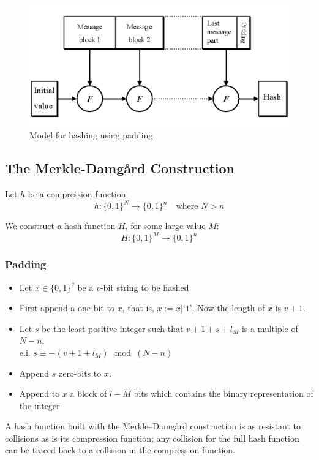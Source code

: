 \begin{figure}[H]
  \centering
  \includegraphics[scale=0.3]{images/10-padding}
  \caption{Model for hashing using padding}
\end{figure}

\subsection{The Merkle-Damgård Construction}
Let $h$ be a compression function:
\[ h: \{0,1\}^N \rightarrow \{0,1\}^n \quad \text{where } N > n \]

We construct a hash-function $H$, for some large value $M$:
\[ H: \{0,1\}^M \rightarrow \{0,1\}^n \]

\subsubsection*{Padding}
\begin{itemize}
\item Let $x \in \{0,1\}^v$ be a $v$-bit string to be hashed
\item First append a one-bit to $x$, that is, $x := x | ‘1’$. Now the length of $x$ is $v + 1$.
\item Let $s$ be the least positive integer such that $v + 1 + s +
  l_M$ is a multiple of $N - n$,\\ e.i. $s \equiv - (v + 1 + l_M) \mod
  (N-n)$
\item Append $s$ zero-bits to $x$.
\item Append to $x$ a block of $l-M$ bits which contains the binary representation of the integer
\end{itemize}

A hash function built with the Merkle–Damgård construction is as
resistant to collisions as is its compression function; any collision
for the full hash function can be traced back to a collision in the
compression function.